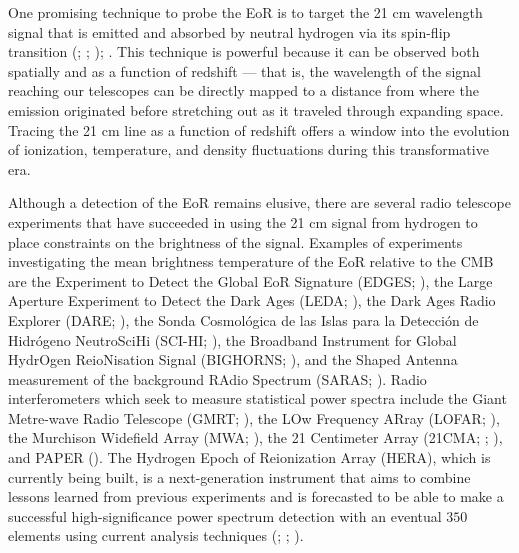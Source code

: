\documentclass[preprint2,numberedappendix,tighten]{aastex6}  %
\begin{document}
One promising technique to probe the EoR is to target the 21 cm wavelength signal that is emitted and absorbed by neutral hydrogen via 
its spin-flip transition (\citealt{furlanetto_et_al2006}; \citealt{morales_and_wyithe2010}; \citealt{pritchard_loeb2012}); . This technique is powerful because it can be observed both spatially and as a function of redshift --- that is, the wavelength 
of the signal reaching our telescopes can be directly mapped to a distance from where the emission originated before 
stretching out as it traveled through expanding space. Tracing the 21 cm line as a function of redshift offers a window into the 
evolution of ionization, temperature, and density fluctuations during this transformative era.

Although a detection of the EoR remains elusive, there are several radio telescope experiments that have succeeded in using 
the 21 cm signal from hydrogen to place constraints on the brightness of the signal. Examples of experiments investigating the 
mean brightness temperature of the EoR relative to the CMB are the Experiment to Detect the Global EoR Signature (EDGES; 
\citealt{bowman2010}), the Large Aperture Experiment to Detect the Dark Ages (LEDA; \citealt{greenhill_bernardi2012}), the 
Dark Ages Radio Explorer (DARE; \citealt{burns2012}), the Sonda Cosmol\'ogica de las Islas para la Detecci\'on de 
Hidr\'ogeno NeutroSciHi (SCI-HI; \citealt{voytek2014}), the Broadband Instrument for Global HydrOgen ReioNisation Signal 
(BIGHORNS; \citealt{sokolowski2015}), and the Shaped Antenna measurement of the background RAdio Spectrum (SARAS; 
\citealt{patra2015}). Radio interferometers which seek to measure statistical power spectra include the Giant Metre-wave 
Radio Telescope (GMRT; \citealt{paciga_et_al2013}), the LOw Frequency ARray (LOFAR; \citealt{van_haarlem_et_al2013}), 
the Murchison Widefield Array (MWA; \citealt{tingay_et_al2013}), the 21 Centimeter Array (21CMA; 
\citealt{peterson_et_al2004}; \citealt{wu2009}), and PAPER (\citealt{parsons_et_al2010}). The Hydrogen Epoch of 
Reionization Array (HERA), which is currently being built, is a next-generation instrument that aims to combine lessons 
learned from previous experiments and is forecasted to be able to make a successful high-significance power spectrum 
detection with an eventual $350$ elements using current analysis techniques (\citealt{pober_et_al2014}; \citealt{liu_parsons_2016}; \citealt{deboer_et_al2017}).
\end{document}
